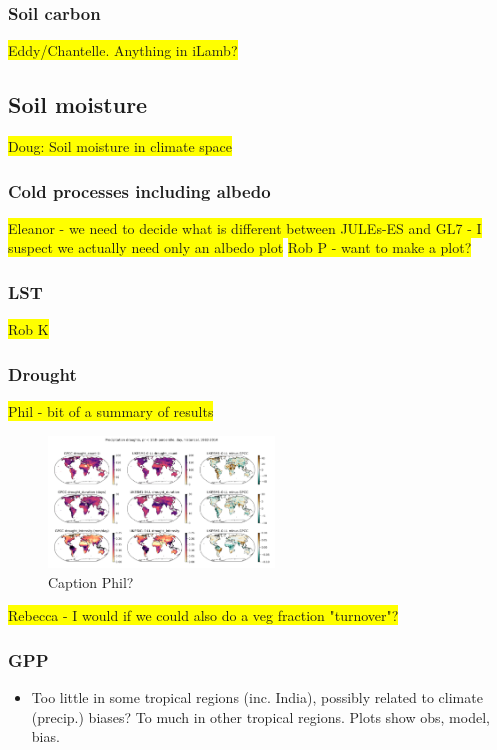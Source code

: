 \documentclass[bg, manuscript]{copernicus}
\newcommand{\hilight}[1]{\colorbox{yellow}{#1}}
\begin{document}
\subsubsection{Soil carbon}
\hilight{Eddy/Chantelle. Anything in iLamb?}

\subsection{Soil moisture}
\hilight{Doug: Soil moisture in climate space}

\subsubsection{Cold processes including albedo}
\hilight{Eleanor - we need to decide what is different between JULEs-ES and GL7 - I suspect we actually need only an albedo plot}
\hilight{Rob P - want to make a plot?}

\subsubsection{LST}
\hilight{Rob K}

\subsubsection{Drought}
\hilight{Phil - bit of a summary of results}
\begin{figure}[t]
    \includegraphics[width=6cm]{figs/drought.png}
    \caption{Caption Phil? \label{fig:drought} }
\end{figure}




\hilight{Rebecca - I would if we could also do a veg fraction "turnover"?}






\subsubsection{GPP}
\begin{itemize}
    \item Too little in some tropical regions (inc. India), possibly related to climate (precip.) biases? To much in other tropical regions. Plots show obs, model, bias.
\end{itemize}
\end{document}
